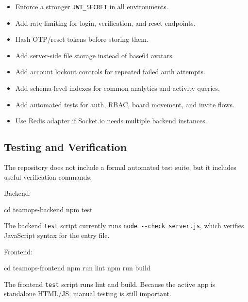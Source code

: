 \documentclass[
]{article}
\newenvironment{Shaded}{}{}
\newcommand{\BuiltInTok}[1]{\textcolor[rgb]{0.00,0.50,0.00}{#1}}
\newcommand{\ExtensionTok}[1]{#1}
\newcommand{\NormalTok}[1]{#1}
\providecommand{\tightlist}{%
  \setlength{\itemsep}{0pt}\setlength{\parskip}{0pt}}
\begin{document}
\begin{itemize}
\tightlist
\item
  Enforce a stronger \texttt{JWT\_SECRET} in all environments.
\item
  Add rate limiting for login, verification, and reset endpoints.
\item
  Hash OTP/reset tokens before storing them.
\item
  Add server-side file storage instead of base64 avatars.
\item
  Add account lockout controls for repeated failed auth attempts.
\item
  Add schema-level indexes for common analytics and activity queries.
\item
  Add automated tests for auth, RBAC, board movement, and invite flows.
\item
  Use Redis adapter if Socket.io needs multiple backend instances.
\end{itemize}

\subsection{Testing and Verification}\label{testing-and-verification}

The repository does not include a formal automated test suite, but it
includes useful verification commands:

Backend:

\begin{Shaded}
\begin{Highlighting}[]
\BuiltInTok{cd}\NormalTok{ teamops{-}backend}
\ExtensionTok{npm}\NormalTok{ test}
\end{Highlighting}
\end{Shaded}

The backend \texttt{test} script currently runs
\texttt{node\ -\/-check\ server.js}, which verifies JavaScript syntax
for the entry file.

Frontend:

\begin{Shaded}
\begin{Highlighting}[]
\BuiltInTok{cd}\NormalTok{ teamops{-}frontend}
\ExtensionTok{npm}\NormalTok{ run lint}
\ExtensionTok{npm}\NormalTok{ run build}
\end{Highlighting}
\end{Shaded}

The frontend \texttt{test} script runs lint and build. Because the
active app is standalone HTML/JS, manual testing is still important.
\end{document}
